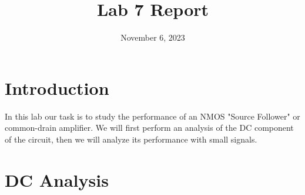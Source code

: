 \documentclass{article}
\title{Lab 7 Report}
\date{November 6, 2023}
\begin{document}
\maketitle
\section{Introduction}

In this lab our task is to study the performance of
an NMOS "Source Follower" or common-drain amplifier.
We will first perform an analysis of the DC component 
of the circuit, then we will analyze its performance
with small signals.

\section{DC Analysis}

\begin{figure}[h!]

\end{figure}
\end{document}
